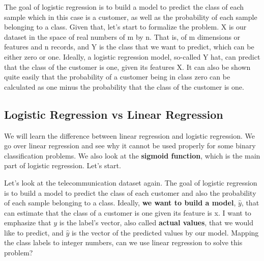 	The goal of logistic regression is to build a model to predict the class of each sample which in this case is a customer, as well as the probability of each sample belonging to a class. Given that, let's start to formalize the problem. X is our dataset in the space of real numbers of m by n. That is, of m dimensions or features and n records, and Y is the class that we want to predict, which can be either zero or one. Ideally, a logistic regression model, so-called Y hat, can predict that the class of the customer is one, given its features X. It can also be shown quite easily that the probability of a customer being in class zero can be calculated as one minus the probability that the class of the customer is one. 
	
	\subsection{Logistic Regression vs Linear Regression}
		
	We will learn the difference between linear regression and logistic regression. We go over linear regression and see why it cannot be used properly for some binary classification problems. We also look at the \textbf{sigmoid function}, which is the main part of logistic regression. Let's start. 
	
	Let's look at the telecommunication dataset again. The goal of logistic regression is to build a model to predict the class of each customer and also the probability of each sample belonging to a class. 
	Ideally, \textbf{we want to build a model}, $\hat{y}$, that can estimate that the class of a customer is one given its feature is x. 
	I want to emphasize that $y$ is the label's vector, also called \textbf{actual values}, that we would like to predict, and $\hat{y}$ is the vector of the predicted values by our model. Mapping the class labels to integer numbers, can we use linear regression to solve this problem? 
	
